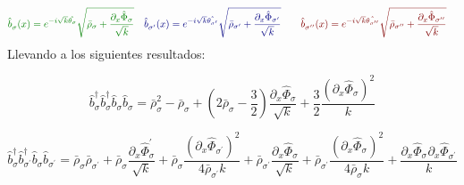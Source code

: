 \begin{align*}
 \textcolor{mygreen}{\hat{b}_{\sigma}^{} (x) = e^{-i \sqrt{k} \hat{\theta_{\sigma}}} \sqrt{ \bar{\rho}_{\sigma} + \frac{\partial_{x} \hat{\Phi}_{\sigma}}{\sqrt{k}}} } 
 & &   \textcolor{myblue}{\hat{b}_{\sigma^{\prime}}^{} (x) = e^{-i \sqrt{k} \hat{\theta_{\sigma^{\prime}}}} \sqrt{ \bar{\rho}_{\sigma^{\prime}} + \frac{\partial_{x} \hat{\Phi}_{\sigma^{\prime}}}{\sqrt{k}}} } \quad & &  \textcolor{myred}{\hat{b}_{\sigma^{\prime \prime}}^{} (x) = e^{-i \sqrt{k} \hat{\theta_{\sigma^{\prime \prime}}}} \sqrt{ \bar{\rho}_{\sigma^{\prime \prime}} + \frac{\partial_{x} \hat{\Phi}_{\sigma^{\prime \prime}}}{\sqrt{k}}} }  & 
\end{align*}
Llevando a los siguientes resultados:


\begin{equation}    \hat{b}_{\sigma}^{\dagger}\hat{b}_{\sigma}^{\dagger} \hat{b}_{\sigma}^{} \hat{b}_{\sigma}^{} = \bar{\rho}_{\sigma}^{2} - \bar{\rho}_{\sigma} +\left( 2\bar{\rho}_{\sigma} - \frac{3}{2}\right) \frac{\partial_{x} \hat{\Phi}_{\sigma}}{\sqrt{k}} + \frac{3}{2} \frac{(\partial_ {x}\hat{\Phi}_{\sigma})^2}{k}
\end{equation}

\begin{equation}   \hat{b}_{\sigma}^{\dagger}\hat{b}_{\sigma^\prime}^{\dagger} \hat{b}_{\sigma}^{} \hat{b}_{\sigma^\prime}^{}  = \bar{\rho}_{\sigma} \bar{\rho}_{\sigma^{\prime}} + \bar{\rho}_{\sigma}  \frac{\partial_{x} \hat{\Phi}_{\sigma}^{\prime}}{\sqrt{k}}
   + \bar{\rho}_{\sigma} \frac{(\partial_{x} \hat{\Phi}_{\sigma^{\prime}})^2}{4\bar{\rho}_{\sigma^{\prime}} k}
    + \bar{\rho}_{\sigma^{\prime}}  \frac{\partial_{x} \hat{\Phi}_{\sigma}^{}}{\sqrt{k}}
   + \bar{\rho}_{\sigma^{\prime}} \frac{(\partial_{x} \hat{\Phi}_{\sigma^{}})^2}{4\bar{\rho}_{\sigma^{}} k}
   + \frac{\partial_{x}\hat{\Phi}_{\sigma^{}} \partial_{x}\hat{\Phi}_{\sigma^{\prime}}}{k}
\end{equation}

